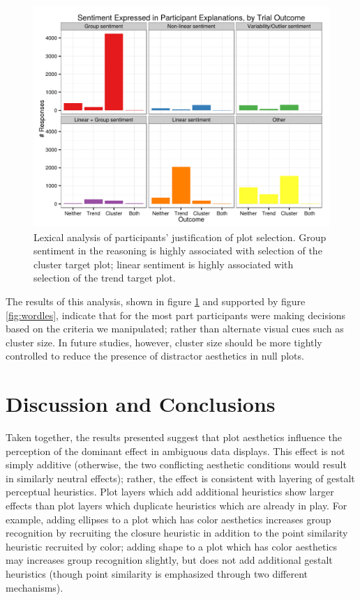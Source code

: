 \documentclass[11pt]{isuthesis}\usepackage[]{graphicx}\usepackage[]{color}
\newenvironment{knitrout}{}{} %
\begin{document}
\begin{figure}[ht]\centering
\begin{knitrout}
\color{fgcolor}

{\centering \includegraphics[width=.8\linewidth]{Figure/FeatureHierarchy/fig-lexical-analysis-1} 

}



\end{knitrout}
\caption[Lexical analysis of participant reasoning]{Lexical analysis of participants' justification of plot selection. Group sentiment in the reasoning is highly associated with selection of the cluster target plot; linear sentiment is highly associated with selection of the trend target plot.}\label{fig:lexicalanalysis}
\end{figure}

The results of this analysis, shown in figure \ref{fig:lexicalanalysis} and supported by figure \ref{fig:wordles}, indicate that for the most part participants were making decisions based on the criteria we manipulated; rather than alternate visual cues such as cluster size. In future studies, however, cluster size should be more tightly controlled to reduce the presence of distractor aesthetics in null plots. 

\section{Discussion and Conclusions}\label{sec:Conclusion}

Taken together, the results presented suggest that plot aesthetics influence the perception of the dominant effect in ambiguous data displays. This effect is not simply additive (otherwise, the two conflicting aesthetic conditions would result in similarly neutral effects); rather, the effect is consistent with layering of gestalt perceptual heuristics. Plot layers which add additional heuristics show larger effects than plot layers which duplicate heuristics which are already in play. For example, adding ellipses to a plot which has color aesthetics increases group recognition by recruiting the closure heuristic in addition to the point similarity heuristic recruited by color; adding shape to a plot which has color aesthetics may increases group recognition slightly, but does not add additional gestalt heuristics (though point similarity is emphasized through two different mechanisms). 
\end{document}
